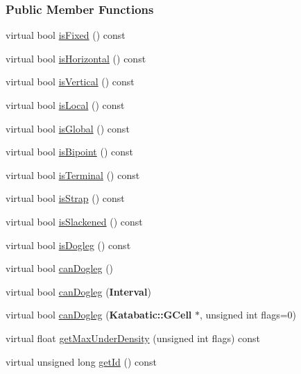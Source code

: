 \subsubsection*{Public Member Functions}
\begin{DoxyCompactItemize}
\item 
virtual bool \hyperlink{classKite_1_1TrackSegment_af5e7d3badddf2ec07159f1d83426d4c1}{is\-Fixed} () const 
\item 
virtual bool \hyperlink{classKite_1_1TrackSegment_ac46ac3b48d712750c7888b48964ac189}{is\-Horizontal} () const 
\item 
virtual bool \hyperlink{classKite_1_1TrackSegment_a2bb30e82aad1f321af4a065338775f36}{is\-Vertical} () const 
\item 
virtual bool \hyperlink{classKite_1_1TrackSegment_a69fb7e260ed2bc6fa82bfe12c2aeec5a}{is\-Local} () const 
\item 
virtual bool \hyperlink{classKite_1_1TrackSegment_a017b1ead8e5988dd0e491cae93ac510c}{is\-Global} () const 
\item 
virtual bool \hyperlink{classKite_1_1TrackSegment_ab5035e6d84cf3ec7b519a5acb109efaa}{is\-Bipoint} () const 
\item 
virtual bool \hyperlink{classKite_1_1TrackSegment_a8d6f4521b27f32080d7477cf8ee8a274}{is\-Terminal} () const 
\item 
virtual bool \hyperlink{classKite_1_1TrackSegment_a4721fcbe9c93ed5392afd9a756b989a8}{is\-Strap} () const 
\item 
virtual bool \hyperlink{classKite_1_1TrackSegment_ab1f9e0bca70dea59558459a003a62d88}{is\-Slackened} () const 
\item 
virtual bool \hyperlink{classKite_1_1TrackSegment_a172b2394f9c2cbaaf5bc4b19e0e76e65}{is\-Dogleg} () const 
\item 
virtual bool \hyperlink{classKite_1_1TrackSegment_aa0bb6f1592688e942ff67e0ac318a4fd}{can\-Dogleg} ()
\item 
virtual bool \hyperlink{classKite_1_1TrackSegment_accb4c6a7ee2678a0cff4dbc4a7860fe1}{can\-Dogleg} ({\bf Interval})
\item 
virtual bool \hyperlink{classKite_1_1TrackSegment_a4f040cf33009e4886d401115c3bea838}{can\-Dogleg} ({\bf Katabatic\-::\-G\-Cell} $\ast$, unsigned int flags=0)
\item 
virtual float \hyperlink{classKite_1_1TrackSegment_a3bc51798c4b09a1537350822025adcea}{get\-Max\-Under\-Density} (unsigned int flags) const 
\item 
virtual unsigned long \hyperlink{classKite_1_1TrackSegment_ae68c47fdf838be02cbf6660cd25a0806}{get\-Id} () const 

\end{DoxyCompactItemize}
